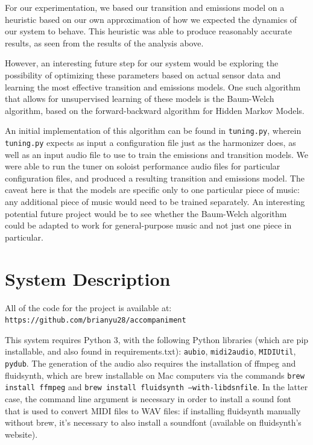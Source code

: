 \documentclass[11pt]{article}
\begin{document}
For our experimentation, we based our transition and emissions model on a heuristic
based on our own approximation of how we expected the dynamics of our system to
behave. This heuristic was able to produce reasonably accurate results, as seen
from the results of the analysis above.

However, an interesting future step for our system would be
exploring the possibility of optimizing these
parameters based on actual sensor data and learning the most effective transition
and emissions models. One such algorithm that allows for unsupervised learning
of these models is the Baum-Welch algorithm, based on the forward-backward
algorithm for Hidden Markov Models.

An initial implementation of this algorithm can be found in \texttt{tuning.py},
wherein \texttt{tuning.py} expects as input a configuration file just as the
harmonizer does, as well as an input audio file to use to train the emissions
and transition models. We were able to run the tuner on soloist performance
audio files for particular configuration files, and produced a resulting
transition and emissions model. The caveat here is that the models are specific
only to one particular piece of music: any additional piece of music would
need to be trained separately. An interesting potential future project
would be to see whether the Baum-Welch algorithm could be adapted to work
for general-purpose music and not just one piece in particular.

\appendix

\section{System Description}

All of the code for the project is available at:
\texttt{https://github.com/brianyu28/accompaniment}

This system requires Python 3, with the following Python libraries (which are pip installable,
and also found in requirements.txt): \texttt{aubio}, \texttt{midi2audio}, \texttt{MIDIUtil},
\texttt{pydub}. The generation of the audio also requires
the installation of ffmpeg and fluidsynth,
which are brew installable on Mac computers via the commands \texttt{brew install ffmpeg}
and \texttt{brew install fluidsynth --with-libdsnfile}. In the latter case, the command line
argument is necessary in order to install a sound font that is used to convert MIDI files to
WAV files: if installing fluidsynth manually without brew, it's necessary to also install a
soundfont (available on fluidsynth's website).
\end{document}

